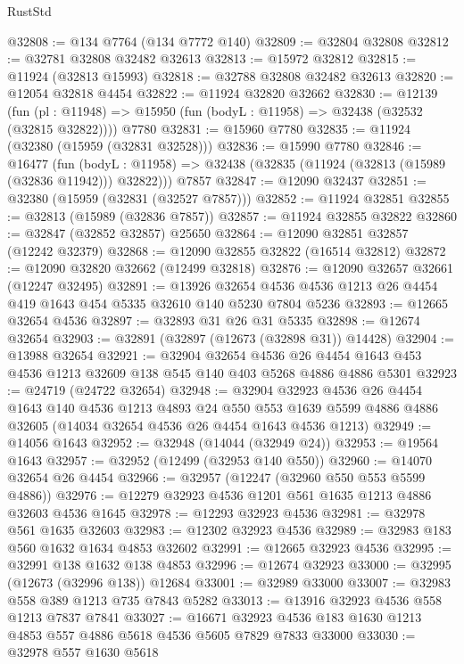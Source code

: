 \begin{lexlean}{RustStd}
\begin{coremodule}
{\begin{coremodule}
{{{{{{{{{{{{{{{{{{{{{{{{{{{{{{{{{{{{{{{{{{{{{{{{{{{{{{{{{{{{{{{{{{{{{{{{{{{{{{{{@32808 := @134 @7764 (@134 @7772 @140)
@32809 := @32804 @32808
@32812 := @32781 @32808 @32482 @32613
@32813 := @15972 @32812
@32815 := @11924 (@32813 @15993)
@32818 := @32788 @32808 @32482 @32613
@32820 := @12054 @32818 @4454
@32822 := @11924 @32820 @32662
@32830 := @12139
    (fun (pl : @11948) => @15950 (fun (bodyL : @11958) => @32438 (@32532 (@32815 @32822))))
    @7780
@32831 := @15960 @7780
@32835 := @11924 (@32380 (@15959 (@32831 @32528)))
@32836 := @15990 @7780
@32846 := @16477
    (fun (bodyL : @11958) => @32438 (@32835 (@11924 (@32813 (@15989 (@32836 @11942))) @32822)))
    @7857
@32847 := @12090 @32437
@32851 := @32380 (@15959 (@32831 (@32527 @7857)))
@32852 := @11924 @32851
@32855 := @32813 (@15989 (@32836 @7857))
@32857 := @11924 @32855 @32822
@32860 := @32847 (@32852 @32857) @25650
@32864 := @12090 @32851 @32857 (@12242 @32379)
@32868 := @12090 @32855 @32822 (@16514 @32812)
@32872 := @12090 @32820 @32662 (@12499 @32818)
@32876 := @12090 @32657 @32661 (@12247 @32495)
@32891 := @13926
    @32654
    @4536
    @4536
    @1213
    @26
    @4454
    @419
    @1643
    @454
    @5335
    @32610
    @140
    @5230
    @7804
    @5236
@32893 := @12665 @32654 @4536
@32897 := @32893 @31 @26 @31 @5335
@32898 := @12674 @32654
@32903 := @32891 (@32897 (@12673 (@32898 @31)) @14428)
@32904 := @13988 @32654
@32921 := @32904
    @32654
    @4536
    @26
    @4454
    @1643
    @453
    @4536
    @1213
    @32609
    @138
    @545
    @140
    @403
    @5268
    @4886
    @4886
    @5301
@32923 := @24719 (@24722 @32654)
@32948 := @32904
    @32923
    @4536
    @26
    @4454
    @1643
    @140
    @4536
    @1213
    @4893
    @24
    @550
    @553
    @1639
    @5599
    @4886
    @4886
    @32605
    (@14034 @32654 @4536 @26 @4454 @1643 @4536 @1213)
@32949 := @14056 @1643
@32952 := @32948 (@14044 (@32949 @24))
@32953 := @19564 @1643
@32957 := @32952 (@12499 (@32953 @140 @550))
@32960 := @14070 @32654 @26 @4454
@32966 := @32957 (@12247 (@32960 @550 @553 @5599 @4886))
@32976 := @12279 @32923 @4536 @1201 @561 @1635 @1213 @4886 @32603 @4536 @1645
@32978 := @12293 @32923 @4536
@32981 := @32978 @561 @1635 @32603
@32983 := @12302 @32923 @4536
@32989 := @32983 @183 @560 @1632 @1634 @4853 @32602
@32991 := @12665 @32923 @4536
@32995 := @32991 @138 @1632 @138 @4853
@32996 := @12674 @32923
@33000 := @32995 (@12673 (@32996 @138)) @12684
@33001 := @32989 @33000
@33007 := @32983 @558 @389 @1213 @735 @7843 @5282
@33013 := @13916 @32923 @4536 @558 @1213 @7837 @7841
@33027 := @16671 @32923 @4536 @183 @1630 @1213 @4853 @557 @4886 @5618 @4536 @5605 @7829 @7833 @33000
@33030 := @32978 @557 @1630 @5618
}}}}}}}}}}}}}}}}}}}}}}}}}}}}}}}}}}}}}}}}}}}}}}}}}}}}}}}}}}}}}}}}}}}}}}}}}}}}}}}}
\end{coremodule}}
\end{coremodule}
\end{lexlean}
